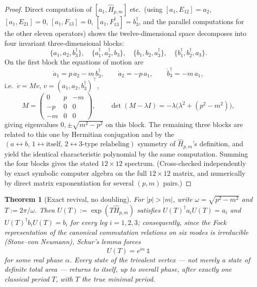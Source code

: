 \documentclass[11pt]{amsart}
\newtheorem{theorem}{Theorem}[section]
\theoremstyle{remark}
\begin{document}
\begin{proof}
Direct computation of $[a_1,\hat H_{p,m}]$ etc.\ (using $[a_1,E_{12}]=a_2$, $[a_1,E_{21}]=0$, $[a_1,F_{13}]=0$, $[a_1,F_{13}^\dagger]=b_3^\dagger$, and the parallel computations for the other eleven operators) shows the twelve-dimensional space decomposes into four invariant three-dimensional blocks:
\[
\{a_1,a_2,b_3^\dagger\},\quad \{a_1^\dagger,a_2^\dagger,b_3\},\quad \{b_1,b_2,a_3^\dagger\},\quad \{b_1^\dagger,b_2^\dagger,a_3\}.
\]
On the first block the equations of motion are
\[
\dot a_1 = p\,a_2 - m\,b_3^\dagger,\qquad \dot a_2=-p\,a_1,\qquad \dot b_3^\dagger = -m\,a_1,
\]
i.e.\ $\dot v = Mv$, $v=(a_1,a_2,b_3^\dagger)^\top$,
\[
M=\begin{pmatrix}0&p&-m\\-p&0&0\\-m&0&0\end{pmatrix},\qquad
\det(M-\lambda I) = -\lambda\big(\lambda^2+(p^2-m^2)\big),
\]
giving eigenvalues $0,\pm\sqrt{m^2-p^2}$ on this block. The remaining three blocks are related to this one by Hermitian conjugation and by the $(a\leftrightarrow b,\,1\leftrightarrow \text{itself},\,2\leftrightarrow3\text{-type relabeling})$ symmetry of $\hat H_{p,m}$'s definition, and yield the identical characteristic polynomial by the same computation. Summing the four blocks gives the stated $12\times12$ spectrum. (Cross-checked independently by exact symbolic computer algebra on the full $12\times12$ matrix, and numerically by direct matrix exponentiation for several $(p,m)$ pairs.)
\end{proof}

\begin{theorem}[Exact revival, no doubling]\label{thm:revival}
For $|p|>|m|$, write $\omega=\sqrt{p^2-m^2}$ and $T:=2\pi/\omega$. Then $U(T):=\exp(T\hat H_{p,m})$ satisfies $U(T)^\dagger a_i U(T)=a_i$ and $U(T)^\dagger b_i U(T) = b_i$ for every leg $i=1,2,3$; consequently, since the Fock representation of the canonical commutation relations on six modes is irreducible (Stone--von Neumann), Schur's lemma forces
\[
U(T)=e^{i\alpha}\,\mathbb 1
\]
for some real phase $\alpha$. Every state of the trivalent vertex --- not merely a state of definite total area --- returns to itself, up to overall phase, after exactly one classical period $T$, with $T$ the true minimal period.
\end{theorem}
\end{document}
